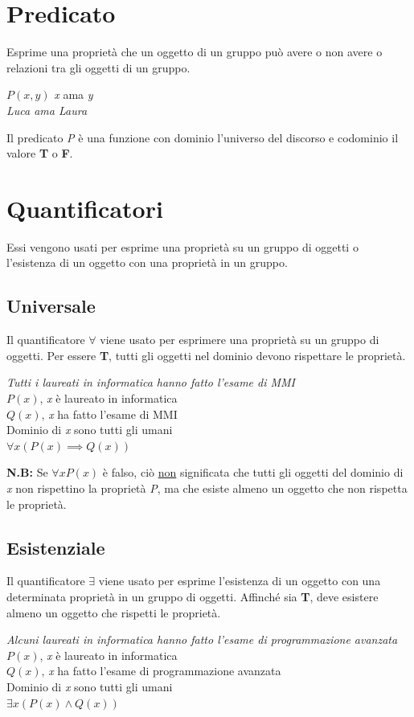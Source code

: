\section{Predicato}
Esprime una proprietà che un oggetto di un gruppo può avere o non avere o relazioni tra gli oggetti di un gruppo.
\begin{example}
$P(x, y)$ \textit{x} ama \textit{y} \\
\emph{Luca ama Laura}
\end{example}

Il predicato \textit{P} è una funzione con dominio l'universo del discorso e codominio il valore \textbf{T} o \textbf{F}.

\section{Quantificatori}
Essi vengono usati per esprime una proprietà su un gruppo di oggetti o l'esistenza di un oggetto con una proprietà in un gruppo.

\subsection{Universale}
Il quantificatore $\forall$ viene usato per esprimere una proprietà su un gruppo di oggetti. Per essere \textbf{T}, tutti gli oggetti nel dominio devono rispettare le proprietà.
\begin{example}
\emph{Tutti i laureati in informatica hanno fatto l'esame di MMI} \\
$P(x)$, \textit{x} è laureato in informatica \\
$Q(x)$, \textit{x} ha fatto l'esame di MMI \\
Dominio di \textit{x} sono tutti gli umani \\
$\forall x(P(x) \implies Q(x))$
\end{example}

\textbf{N.B:} Se $\forall xP(x)$ è falso, ciò \underline{non} significata che tutti gli oggetti del dominio di \textit{x} non rispettino la proprietà \textit{P}, ma che esiste almeno un oggetto che non rispetta le proprietà.

\subsection{Esistenziale}
Il quantificatore $\exists$ viene usato per esprime l'esistenza di un oggetto con una determinata proprietà in un gruppo di oggetti. Affinché sia \textbf{T}, deve esistere almeno un oggetto che rispetti le proprietà.
\begin{example}
\emph{Alcuni laureati in informatica hanno fatto l'esame di programmazione avanzata} \\
$P(x)$, \textit{x} è laureato in informatica \\
$Q(x)$, \textit{x} ha fatto l'esame di programmazione avanzata \\
Dominio di \textit{x} sono tutti gli umani \\
$\exists x(P(x) \wedge Q(x))$
\end{example}

